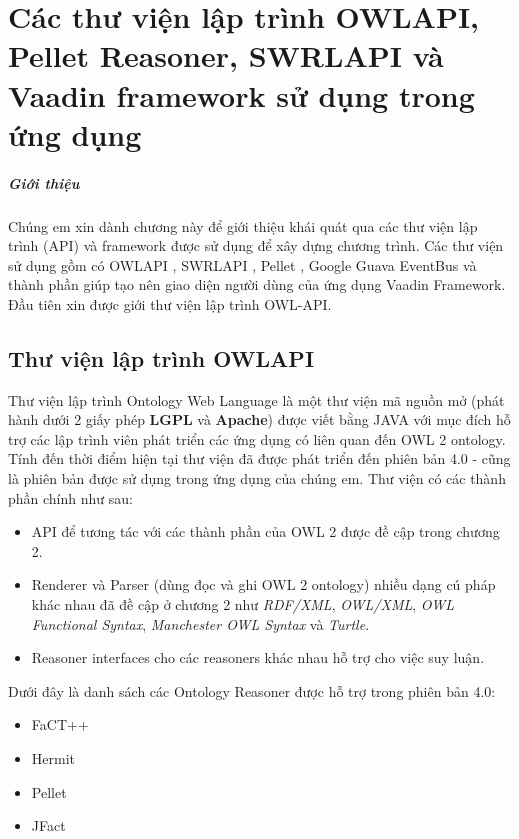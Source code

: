 \chapter{Các thư viện lập trình OWLAPI, Pellet Reasoner, SWRLAPI và Vaadin framework sử dụng trong ứng dụng}
\paragraph{Giới thiệu} Chúng em xin dành chương này để giới thiệu khái quát qua các thư viện lập trình (API) và framework được sử dụng để xây dựng chương trình. Các thư viện sử dụng gồm có OWLAPI \cite{owlapi}, SWRLAPI \cite{swrlapi}, Pellet \cite{pellet}, Google Guava EventBus và thành phần giúp tạo nên giao diện người dùng của ứng dụng Vaadin Framework. Đầu tiên xin được giới thư viện lập trình OWL-API.
\section{Thư viện lập trình OWLAPI}
Thư viện lập trình Ontology Web Language là một thư viện mã nguồn mở (phát hành dưới 2 giấy phép \textbf{LGPL} và \textbf{Apache}) \cite{owlapi} được viết bằng JAVA với mục đích hỗ trợ các lập trình viên phát triển các ứng dụng có liên quan đến OWL 2 ontology. Tính đến thời điểm hiện tại thư viện đã được phát triển đến phiên bản 4.0 - cũng là phiên bản được sử dụng trong ứng dụng của chúng em.
Thư viện có các thành phần chính như sau: 
\begin{itemize}
\item API để tương tác với các thành phần của OWL 2 được đề cập trong chương 2.
\item Renderer và Parser (dùng đọc và ghi OWL 2 ontology) nhiều dạng cú pháp khác nhau đã đề cập ở chương 2 như \textit{RDF/XML}, \textit{OWL/XML}, \textit{OWL Functional Syntax}, \textit{Manchester OWL Syntax} và \textit{Turtle}.
\item Reasoner interfaces cho các reasoners khác nhau hỗ trợ cho việc suy luận.
\end{itemize}
Dưới đây là danh sách các Ontology Reasoner được hỗ trợ trong phiên bản 4.0:
\begin{itemize}
\item FaCT++ 
\item Hermit
\item Pellet \cite{pellet}
\item JFact 
\end{itemize}
